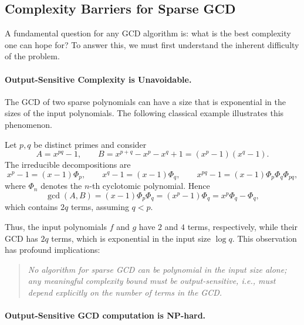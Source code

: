 \documentclass{article}
\numberwithin{equation}{section}
\begin{document}
\subsection{Complexity Barriers for Sparse GCD}

A fundamental question for any GCD algorithm is: what is the best complexity one can hope for? To answer this, we must first understand the inherent difficulty of the problem.

\paragraph{Output-Sensitive Complexity is Unavoidable.}

The GCD of two sparse polynomials can have a size that is exponential in the sizes of the input polynomials. The following classical example illustrates this phenomenon.

\begin{example}
\label{ex-GCD1}
Let $p, q$ be distinct primes and consider
\[
A = x^{pq} - 1, \qquad 
B = x^{p+q} - x^p - x^q + 1 = (x^p - 1)(x^q - 1).
\]
The irreducible decompositions are
\[
x^p - 1 = (x-1)\Phi_p,\qquad
x^q - 1 = (x-1)\Phi_q,\qquad
x^{pq} - 1 = (x-1)\Phi_p\Phi_q\Phi_{pq},
\]
where $\Phi_n$ denotes the $n$-th cyclotomic polynomial. Hence
\[
\gcd(A,B) = (x-1)\Phi_p\Phi_q = (x^p-1)\Phi_q = x^p\Phi_q - \Phi_q,
\]
which contains $2q$ terms, assuming $q < p$.
\end{example}

Thus, the input polynomials $f$ and $g$ have $2$ and $4$ terms, respectively, while their GCD has $2q$ terms, which is exponential in the input size $\log q$. This observation has profound implications:

\begin{quote}
\emph{No algorithm for sparse GCD can be polynomial in the input size alone; any meaningful complexity bound must be output-sensitive, i.e., must depend explicitly on the number of terms in the GCD.}
\end{quote}

\paragraph{Output-Sensitive GCD computation is NP-hard.}
\end{document}
